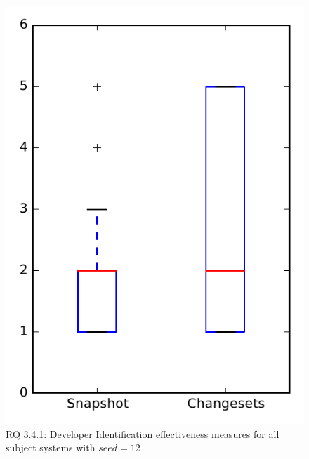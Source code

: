 
\begin{figure}
\centering
\includegraphics[height=0.4\textheight]{figures/dit_seed/rq1_overview_12}
\caption{RQ 3.4.1: Developer Identification effectiveness measures for all subject systems with $seed=12$}
\label{fig:dit_seed:rq1:overview}
\end{figure}
